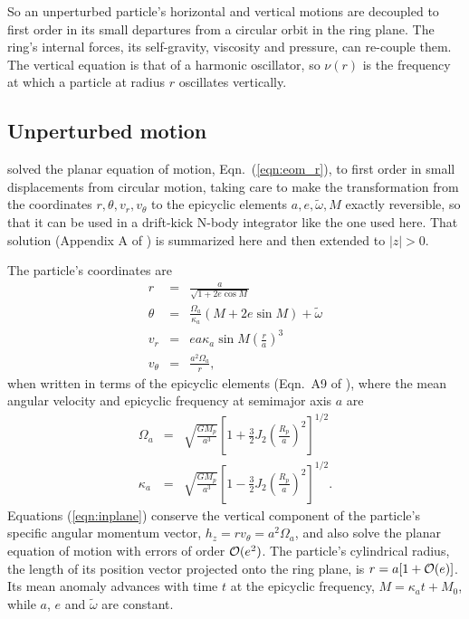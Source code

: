 \documentclass[twocolumn]{aastex702}
\begin{document}
So an unperturbed particle's horizontal and vertical motions are decoupled to first order in its small
departures from a circular orbit in the ring plane. The ring's internal forces, its self-gravity,
viscosity and pressure, can re-couple them. The vertical equation is that of a harmonic oscillator,
so $\nu(r)$ is the frequency at which a particle at radius $r$ oscillates vertically.

\subsection{Unperturbed motion}
\label{sec:elem2coords}

\cite{H25} solved the planar equation of motion, Eqn.\ (\ref{eqn:eom_r}), to first
order in small displacements from circular motion, taking care to make the transformation from the
coordinates $r, \theta, v_r, v_\theta$ to the epicyclic elements $a, e, \tilde{\omega}, M$ exactly
reversible, so that it can be used in a drift-kick N-body integrator like the one used here. That
solution (Appendix A of \citealt{H25}) is summarized here and then extended to $|z| > 0$.

The particle's coordinates are
\begin{subequations}
\label{eqn:inplane}
\begin{eqnarray}
    r &=& \frac{a}{\sqrt{1 + 2e\cos M}} \label{eqn:inplane_a}\\
    \theta &=& \frac{\Omega_a}{\kappa_a}(M + 2e\sin M) + \tilde{\omega} \label{eqn:inplane_b}\\
    v_r &=& ea\kappa_a\sin M\left(\frac{r}{a}\right)^3 \label{eqn:inplane_c}\\
    v_\theta &=& \frac{a^2\Omega_a}{r}, \label{eqn:inplane_d}
\end{eqnarray}
\end{subequations}
when written in terms of the epicyclic elements (Eqn.\ A9 of \citealt{H25}), where the mean angular
velocity and epicyclic frequency at semimajor axis $a$ are
\begin{subequations}
\label{eqn:Omega_kappa}
\begin{eqnarray}
    \Omega_a &=& \sqrt{\frac{GM_p}{a^3}}\left[1 + \frac{3}{2}J_2\left(\frac{R_p}{a}\right)^2\right]^{1/2} \label{eqn:Omega_kappa_a}\\
    \kappa_a &=& \sqrt{\frac{GM_p}{a^3}}\left[1 - \frac{3}{2}J_2\left(\frac{R_p}{a}\right)^2\right]^{1/2}. \label{eqn:Omega_kappa_b}
\end{eqnarray}
\end{subequations}
Equations (\ref{eqn:inplane}) conserve the vertical component of the particle's specific
angular momentum vector, $h_z = rv_\theta = a^2\Omega_a$, and also solve the planar equation of motion
with errors of order ${\cal O}(e^2)$. The particle's cylindrical radius, the length of its position
vector projected onto the ring plane, is $r = a[1 + {\cal O}(e)]$. Its mean anomaly advances with time $t$
at the epicyclic frequency, $M = \kappa_a t + M_0$, while $a$, $e$ and $\tilde{\omega}$ are constant.
\end{document}
